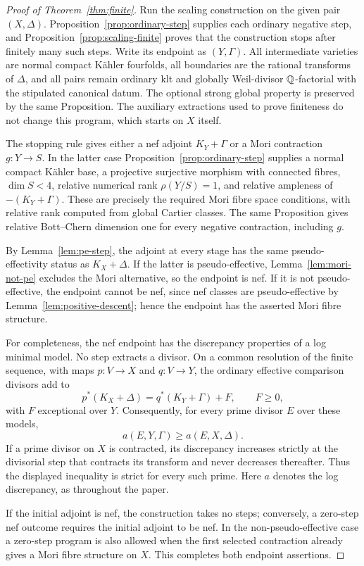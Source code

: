 \begin{proof}[Proof of Theorem~\ref{thm:finite}]
Run the scaling construction on the given pair $(X,\Delta)$.
Proposition~\ref{prop:ordinary-step} supplies each ordinary negative step,
and Proposition~\ref{prop:scaling-finite} proves that the construction
stops after finitely many such steps.  Write its endpoint as $(Y,\Gamma)$.
All intermediate varieties are normal compact Kähler fourfolds, all
boundaries are the rational transforms of $\Delta$, and all pairs remain
ordinary klt and globally Weil-divisor $\mathbb Q$-factorial with the stipulated
canonical datum.  The optional strong global property is preserved by the
same Proposition.  The auxiliary extractions used to prove finiteness do
not change this program, which starts on $X$ itself.

The stopping rule gives either a nef adjoint $K_Y+\Gamma$ or a Mori
contraction $g:Y\to S$.  In the latter case
Proposition~\ref{prop:ordinary-step} supplies a normal compact Kähler base,
a projective surjective morphism with connected fibres, $\dim S<4$,
relative numerical rank $\rho(Y/S)=1$, and relative ampleness of
$-(K_Y+\Gamma)$.  These are precisely the required Mori fibre space
conditions, with relative rank computed from global Cartier classes.
The same Proposition gives relative Bott--Chern dimension one for every
negative contraction, including $g$.

By Lemma~\ref{lem:pe-step}, the adjoint at every stage has the same
pseudo-effectivity status as $K_X+\Delta$.  If the latter is
pseudo-effective, Lemma~\ref{lem:mori-not-pe} excludes the Mori alternative,
so the endpoint is nef.  If it is not pseudo-effective, the endpoint
cannot be nef, since nef classes are pseudo-effective by
Lemma~\ref{lem:positive-descent}; hence the endpoint has the asserted Mori
fibre structure.

For completeness, the nef endpoint has the discrepancy properties of a
log minimal model.  No step extracts a divisor.  On a common resolution of
the finite sequence, with maps $p:V\to X$ and $q:V\to Y$, the ordinary
effective comparison divisors add to
\[
 p^*(K_X+\Delta)=q^*(K_Y+\Gamma)+F,
 \qquad F\geq0,
\]
with $F$ exceptional over $Y$.  Consequently, for every prime divisor $E$
over these models,
\[
 a(E,Y,\Gamma)\geq a(E,X,\Delta).
\]
If a prime divisor on $X$ is contracted, its discrepancy increases strictly
at the divisorial step that contracts its transform and never decreases
thereafter.  Thus the displayed inequality is strict for every such
prime.  Here $a$ denotes the log discrepancy, as throughout the paper.

If the initial adjoint is nef, the construction takes no steps; conversely,
a zero-step nef outcome requires the initial adjoint to be nef.  In the
non-pseudo-effective case a zero-step program is also allowed when the
first selected contraction already gives a Mori fibre structure on $X$.
This completes both endpoint assertions.
\end{proof}
